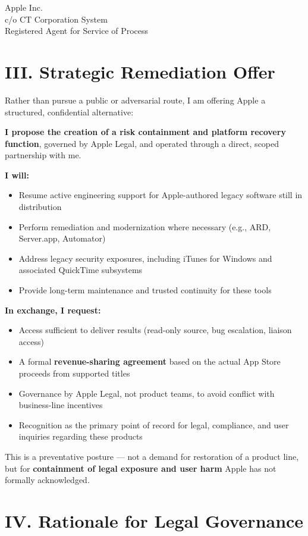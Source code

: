 \documentclass[11pt]{letter}
\begin{document}
\begin{letter}{Apple Inc.\\
    c/o CT Corporation System\\
    Registered Agent for Service of Process\\
    [Insert DE or CA Address Here]}
        \section*{III. Strategic Remediation Offer}

        Rather than pursue a public or adversarial route, I am offering Apple a structured, confidential alternative:

        \textbf{I propose the creation of a risk containment and platform recovery function}, governed by Apple Legal, and operated through a direct, scoped partnership with me.

        \textbf{I will:}
        \begin{itemize}
            \item Resume active engineering support for Apple-authored legacy software still in distribution
            \item Perform remediation and modernization where necessary (e.g., ARD, Server.app, Automator)
            \item Address legacy security exposures, including iTunes for Windows and associated QuickTime subsystems
            \item Provide long-term maintenance and trusted continuity for these tools
        \end{itemize}

        \textbf{In exchange, I request:}
        \begin{itemize}
            \item Access sufficient to deliver results (read-only source, bug escalation, liaison access)
            \item A formal \textbf{revenue-sharing agreement} based on the actual App Store proceeds from supported titles
            \item Governance by Apple Legal, not product teams, to avoid conflict with business-line incentives
            \item Recognition as the primary point of record for legal, compliance, and user inquiries regarding these products
        \end{itemize}

        This is a preventative posture — not a demand for restoration of a product line, but for \textbf{containment of legal exposure and user harm} Apple has not formally acknowledged.

        \section*{IV. Rationale for Legal Governance}


\end{letter}
\end{document}
